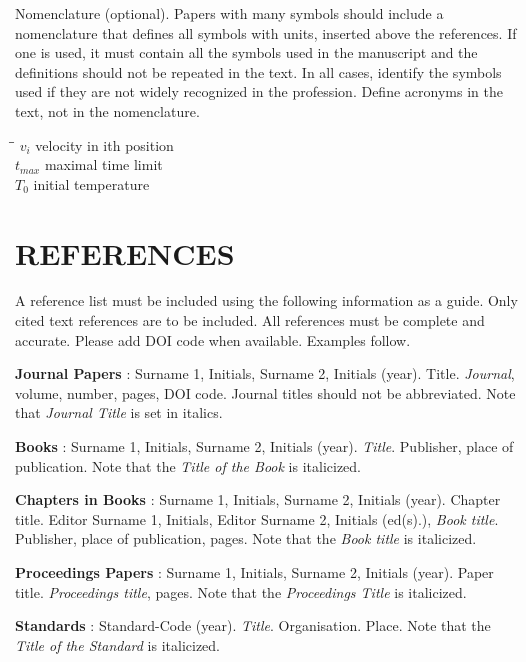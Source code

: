 \documentclass[10pt]{JoME}
\begin{document}
Nomenclature (optional). Papers with many symbols should include a nomenclature that defines all symbols with units, inserted above the references. If one is used, it must contain all the symbols used in the manuscript and the definitions should not be repeated in the text. In all cases, identify the symbols used if they are not widely recognized in the profession. Define acronyms in the text, not in the nomenclature.
\begin{tabbing}
\hspace*{10mm}\=\hspace*{15mm}\= \kill
$v_i$	\> [ms$^{-1}$] \> velocity in ith position\\
$t_{max}$	\> [min]  \> maximal time limit\\
$T_0$	\> [K]	\> initial temperature
\end{tabbing}

\section{REFERENCES}

A reference list must be included using the following information as a guide. Only cited text references are to be included. All references must be complete and accurate. Please add DOI code when available. Examples follow.
 
\textrm{\textbf{Journal Papers}  \cite{bib1}: 
Surname 1, Initials, Surname 2, Initials (year). Title. \textit{Journal}, volume, number, pages, DOI code. Journal titles should not be abbreviated. Note that \textit{Journal Title} is set in italics.} 

\textrm{\textbf{Books} \cite{bib2}: Surname 1, Initials, Surname 2, Initials (year). \textit{Title}. Publisher, place of publication. Note that the \textit{Title of the Book} is italicized.} 

\textrm{\textbf{Chapters in Books} \cite{bib3}:
Surname 1, Initials, Surname 2, Initials (year). Chapter title. Editor Surname 1, Initials, Editor Surname 2, Initials (ed(s).), \textit{Book title}. Publisher, place of publication, pages. Note that the \textit{Book title} is italicized.}

\textrm{\textbf{Proceedings Papers}  \cite{bib4}:
Surname 1, Initials, Surname 2, Initials (year). Paper title. \textit{Proceedings title}, pages. Note that the \textit{Proceedings Title} is italicized.}

\textrm{\textbf{Standards} \cite{bib5}: Standard-Code (year). \textit{Title}. Organisation. Place. Note that the \textit{Title of the Standard} is italicized.}
\end{document}
